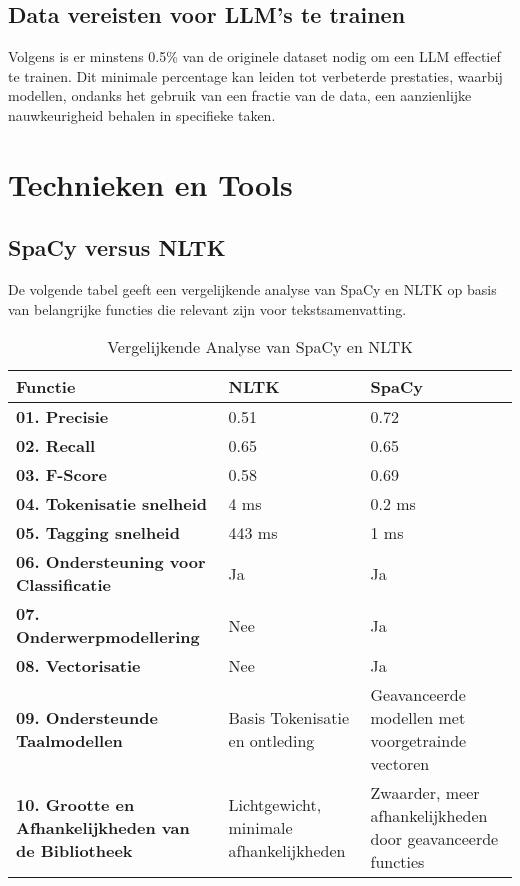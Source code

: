 \subsection{Data vereisten voor LLM's te trainen}
\label{sec:DataVereisten}
Volgens \textcite{Scispace} is er minstens 0.5\% van de originele dataset nodig om een LLM effectief te trainen. Dit minimale percentage kan leiden tot verbeterde prestaties, waarbij modellen, ondanks het gebruik van een fractie van de data, een aanzienlijke nauwkeurigheid behalen in specifieke taken.









\section{Technieken en Tools}
\subsection{SpaCy versus NLTK}

De volgende tabel geeft een vergelijkende analyse van SpaCy en NLTK op basis van belangrijke functies die relevant zijn voor tekstsamenvatting.


\begin{table}[H]
    \centering
    \begin{tabular}{|p{4cm}|p{5cm}|p{5cm}|}
        \hline
        \textbf{Functie} & \textbf{NLTK} & \textbf{SpaCy} \\ \hline
        \textbf{01. Precisie} & 0.51 & 0.72 \\ \hline
        \textbf{02. Recall} & 0.65 & 0.65 \\ \hline
        \textbf{03. F-Score} & 0.58 & 0.69 \\ \hline
        \textbf{04. Tokenisatie snelheid} & 4 ms & 0.2 ms \\ \hline
        \textbf{05. Tagging snelheid} & 443 ms & 1 ms \\ \hline
        \textbf{06. Ondersteuning voor Classificatie} & Ja & Ja \\ \hline
        \textbf{07. Onderwerpmodellering} & Nee & Ja \\ \hline
        \textbf{08. Vectorisatie} & Nee & Ja \\ \hline
        \textbf{09. Ondersteunde Taalmodellen} & Basis Tokenisatie en ontleding & Geavanceerde modellen met voorgetrainde vectoren \\ \hline
        \textbf{10. Grootte en Afhankelijkheden van de Bibliotheek} & Lichtgewicht, minimale afhankelijkheden & Zwaarder, meer afhankelijkheden door geavanceerde functies \\ \hline
    \end{tabular}
    \caption{Vergelijkende Analyse van SpaCy en NLTK \autocite{amade2024automatic}}
    \label{tab:Vergelijking Spacy en NLTK}
\end{table}



